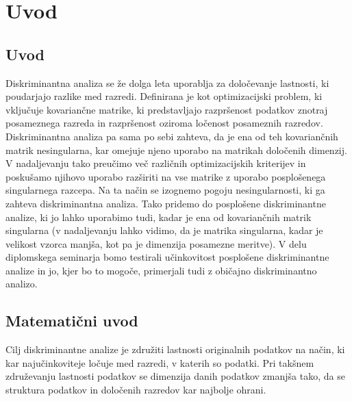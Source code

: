 \documentclass[mat1]{article}
\theoremstyle{definition}
\begin{document}
\section{Uvod}

\subsection{Uvod}


Diskriminantna analiza se že dolga leta uporablja za določevanje lastnosti, ki poudarjajo razlike med razredi. Definirana je kot optimizacijski problem, ki vključuje kovariančne matrike, ki predstavljajo razpršenost podatkov znotraj posameznega razreda in razpršenost oziroma ločenost posameznih razredov. Diskriminantna analiza pa sama po sebi zahteva, da je ena od teh kovariančnih matrik nesingularna, kar omejuje njeno uporabo na matrikah določenih dimenzij. V nadaljevanju tako preučimo več različnih optimizacijskih kriterijev in poskušamo njihovo uporabo razširiti na vse matrike z uporabo posplošenega singularnega razcepa. Na ta način se izognemo pogoju nesingularnosti, ki ga zahteva diskriminantna analiza. Tako pridemo do posplošene diskriminantne analize, ki jo lahko uporabimo tudi, kadar je ena od kovariančnih matrik singularna (v nadaljevanju lahko vidimo, da je matrika singularna, kadar je velikost vzorca manjša, kot pa je dimenzija posamezne meritve). V delu diplomskega seminarja bomo testirali učinkovitost posplošene diskriminantne analize in jo, kjer bo to mogoče, primerjali tudi z običajno diskriminantno analizo.

\subsection{Matematični uvod}

Cilj diskriminantne analize je združiti lastnosti originalnih podatkov na način, ki kar najučinkoviteje ločuje med razredi, v katerih so podatki. Pri takšnem združevanju lastnosti podatkov se dimenzija danih podatkov zmanjša tako, da se struktura podatkov in določenih razredov kar najbolje ohrani.
\end{document}
